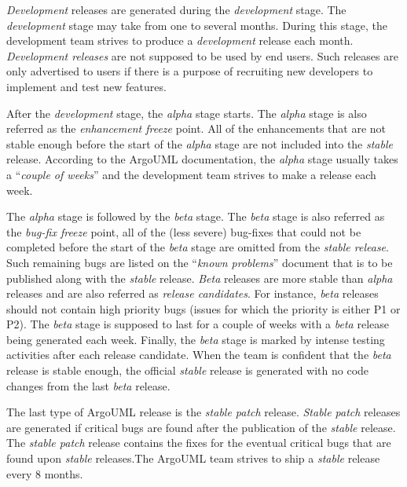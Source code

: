 {\em Development} releases are generated during the {\em development} stage.
The {\em development} stage may take from one to several months. During this
stage, the development team strives to produce a {\em development} release each
month. {\em Development releases} are not supposed to be used by end users. Such
releases are only advertised to users if there is a purpose of recruiting new
developers to implement and test new features.\footnotemark[21]

After the {\em development} stage, the {\em alpha} stage starts. The {\em
alpha} stage is also referred as the {\em enhancement freeze} point. All of the
enhancements that are not stable enough before the start of the {\em alpha}
stage are not included into the {\em stable} release. According to the ArgoUML
documentation, the {\em alpha} stage usually takes a ``{\em couple of weeks}''
and the development team strives to make a release each week.\footnotemark[21]

The {\em alpha} stage is followed by the {\em beta} stage. The {\em beta}
stage is also referred as the {\em bug-fix freeze} point, \ie all of the (less
severe) bug-fixes that could not be completed before the start of the {\em beta}
stage are omitted from the {\em stable release}. Such remaining bugs are listed
on the ``{\em known problems}'' document that is to be published along with the
{\em stable} release. {\em Beta} releases are more stable than {\em alpha} releases
and are also referred as {\em release candidates}. For instance, {\em beta}
releases should not contain high priority bugs (\ie issues for which the
priority is either P1 or P2).  The {\em beta} stage is supposed to last for a
couple of weeks with a {\em beta} release being generated each week. Finally,
the {\em beta} stage is marked by intense testing activities after each release
candidate. When the team is confident that the {\em beta} release is stable
enough, the official {\em stable} release is generated with no code changes from
the last {\em beta} release.\footnotemark[21]

The last type of ArgoUML release is the {\em stable patch} release. {\em Stable
patch} releases are generated if critical bugs are found after the publication
of the {\em stable} release. The {\em stable patch} release contains the fixes
for the eventual critical bugs that are found upon {\em stable}
releases.\footnotemark[21] The ArgoUML team strives to ship a {\em stable}
release every 8
months.

